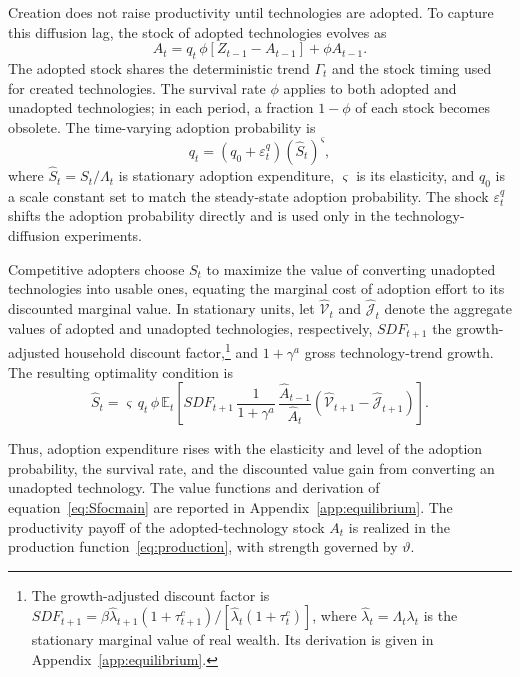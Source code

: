 \documentclass[a4paper,11pt]{article}
\begin{document}
Creation does not raise productivity until technologies are adopted.
To capture this diffusion lag, the stock of adopted technologies evolves as
\begin{equation} \label{eq:A}
    A_{t} = q_t\, \phi \left[Z_{t-1} - A_{t-1}\right] + \phi A_{t-1}.
\end{equation}
The adopted stock shares the deterministic trend $\Gamma_t$ and the stock timing used for created technologies.
The survival rate $\phi$ applies to both adopted and unadopted technologies; in each period, a fraction $1-\phi$ of each stock becomes obsolete.
The time-varying adoption probability is
\begin{equation} \label{eq:qmain}
    q_t = \left(q_0+\varepsilon_t^q\right)\left(\hat{S}_t\right)^{\varsigma},
\end{equation}
where $\hat{S}_t=S_t/\Lambda_t$ is stationary adoption expenditure, $\varsigma$ is its elasticity, and $q_0$ is a scale constant set to match the steady-state adoption probability.
The shock $\varepsilon_t^q$ shifts the adoption probability directly and is used only in the technology-diffusion experiments.

Competitive adopters choose $S_t$ to maximize the value of converting unadopted technologies into usable ones, equating the marginal cost of adoption effort to its discounted marginal value.
In stationary units, let $\hat{\mathcal{V}}_t$ and $\hat{\mathcal{J}}_t$ denote the aggregate values of adopted and unadopted technologies, respectively, $\mathit{SDF}_{t+1}$ the growth-adjusted household discount factor,\footnote{The growth-adjusted discount factor is $\mathit{SDF}_{t+1}=\beta\hat\lambda_{t+1}(1+\tau_{t+1}^c)/[\hat\lambda_t(1+\tau_t^c)]$, where $\hat\lambda_t=\Lambda_t\lambda_t$ is the stationary marginal value of real wealth. Its derivation is given in Appendix~\ref{app:equilibrium}.} and $1+\gamma^a$ gross technology-trend growth.
The resulting optimality condition is
\begin{equation} \label{eq:Sfocmain}
    \hat{S}_t = \varsigma\, q_t\, \phi\, \mathbb{E}_t\!\left[\mathit{SDF}_{t+1}\,
    \frac{1}{1+\gamma^{a}}\, \frac{\hat{A}_{t-1}}{\hat{A}_t}
    \left(\hat{\mathcal{V}}_{t+1}-\hat{\mathcal{J}}_{t+1}\right)\right].
\end{equation}

Thus, adoption expenditure rises with the elasticity and level of the adoption probability, the survival rate, and the discounted value gain from converting an unadopted technology.
The value functions and derivation of equation~\eqref{eq:Sfocmain} are reported in Appendix~\ref{app:equilibrium}.
The productivity payoff of the adopted-technology stock $A_t$ is realized in the production function~\eqref{eq:production}, with strength governed by $\vartheta$.
\end{document}
